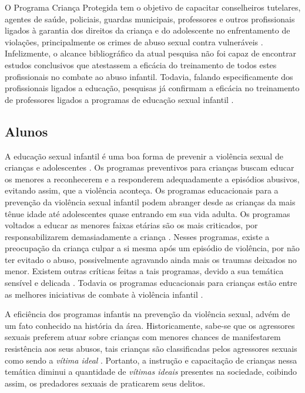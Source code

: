 O Programa Criança Protegida tem o objetivo de capacitar conselheiros tutelares, agentes de saúde, policiais, guardas municipais, professores e outros profissionais ligados à garantia dos direitos da criança e do adolescente no enfrentamento de violações, principalmente os crimes de abuso sexual contra vulneráveis \cite{oei2020tomada}. Infelizmente, o alcance bibliográfico da atual pesquisa não foi capaz de encontrar estudos conclusivos que atestassem a eficácia do treinamento de todos estes profissionais no combate ao abuso infantil. Todavia, falando especificamente dos profissionais ligados a educação, pesquisas já confirmam a eficácia no treinamento de professores ligados a programas de educação sexual infantil \cite{colleen2016advancing}. 

\subsection{Alunos}\label{ssec:alunos}

A educação sexual infantil é uma boa forma de prevenir a violência sexual de crianças e adolescentes \cite{finkelhor2009prevention}. Os programas preventivos para crianças buscam educar os menores a reconhecerem e a responderem adequadamente a episódios abusivos, evitando assim, que a violência aconteça. Os programas educacionais para a prevenção da violência sexual infantil podem abranger desde as crianças da mais tênue idade até adolescentes quase entrando em sua vida adulta. Os programas voltados a educar as menores faixas etárias são os mais criticados, por responsabilizarem demasiadamente a criança \cite{colleen2016advancing}. Nesses programas, existe a preocupação da criança culpar a si mesma após um episódio de violência, por não ter evitado o abuso, possivelmente agravando ainda mais os traumas deixados no menor. Existem outras críticas feitas a tais programas, devido a sua temática sensível e delicada \cite{scholes2014serious}. Todavia os programas educacionais para crianças estão entre as melhores iniciativas de combate à violência infantil \cite{barron2008school, finkelhor2009prevention}.

A eficiência dos programas infantis na prevenção da violência sexual, advém de um fato conhecido na história da área. Historicamente, sabe-se que os agressores sexuais preferem atuar sobre crianças com menores chances de manifestarem resistência aos seus abusos, tais crianças são classificadas pelos agressores sexuais como sendo a \textit{vítima ideal} \cite{budin1989sex}. Portanto, a instrução e capacitação de crianças nessa temática diminui a quantidade de \textit{vítimas ideais} presentes na sociedade, coibindo assim, os predadores sexuais de praticarem seus delitos.


